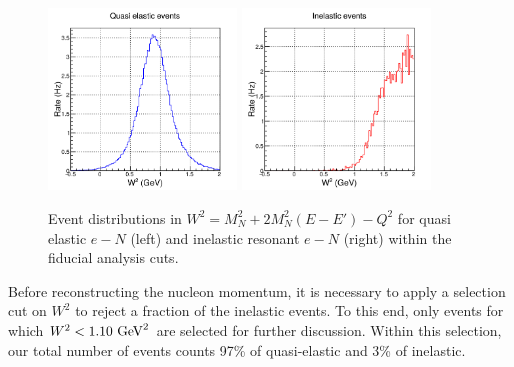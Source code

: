 \documentclass[11pt]{article}
\begin{document}
\begin{figure}[h]
  \centering
    \includegraphics[width=5cm]{W2_sig.pdf}
    \includegraphics[width=5cm]{W2_inel.pdf}
    \caption{Event distributions in $W^2 = M_{N}^2+2M_{N}^{2}(E-E')-Q^2$  for quasi elastic $e-N$ (left) and inelastic resonant $e-N$ (right) within the fiducial analysis cuts.}
    \label{fig:W2}
\end{figure}
%

Before reconstructing the nucleon momentum, it is necessary to apply a selection cut on $W^2$ to reject a fraction of the inelastic events. To this end, only events for which $W^2<1.10~{\rm GeV}^2$ are selected for further discussion. Within this selection, our total number of events counts 97\% of quasi-elastic and 3\% of inelastic.
\end{document}
